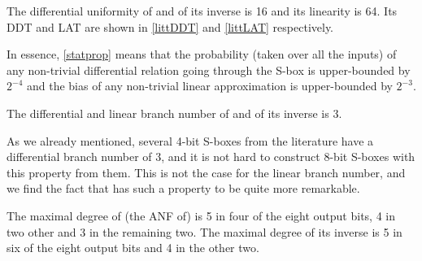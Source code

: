 \begin{prop}
\label{statprop}
The differential uniformity of \littlunOne and of its inverse is 16 and its linearity is 64.
Its DDT and LAT are shown in \autoref{littDDT} and \autoref{littLAT} respectively.
\end{prop}

In essence, \autoref{statprop} means that the probability (taken over all the inputs) of any non-trivial differential relation going through
the S-box is upper-bounded by $2^{-4}$ and the bias of any non-trivial linear approximation is upper-bounded by $2^{-3}$.

\begin{prop}
The differential and linear branch number of \littlunOne and of its inverse is 3.
\end{prop}

As we already mentioned, several 4-bit S-boxes from the literature have a differential branch number of 3, and it is not hard to construct
8-bit S-boxes with this property from them. This is not the case for the linear branch number, and we find the fact that \littlunOne
has such a property to be quite more remarkable.

\begin{prop}
The maximal degree of (the ANF of) \littlunOne is 5 in four of the eight output bits,
4 in two other and 3 in the remaining two. The maximal degree of its inverse is 5 in six of the eight output bits
and 4 in the other two.
\end{prop}



